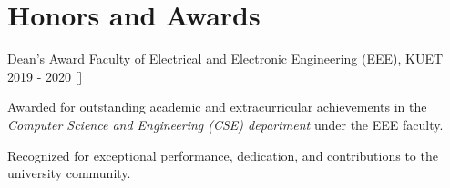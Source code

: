 \section{\textbf{Honors and Awards}}

\resumeSubHeadingListStart

\resumeProject
  {Dean's Award}
  {Faculty of Electrical and Electronic Engineering (EEE), KUET}
  {2019 - 2020}
  {{}[\href{https://old.kuet.ac.bd/index.php/welcome/deanslist}{\textcolor{darkblue}{\faGlobe}}]} %

\resumeItemListStart
  \item Awarded for outstanding academic and extracurricular achievements in the \textit{Computer Science and Engineering (CSE) department} under the EEE faculty.
  \item Recognized for exceptional performance, dedication, and contributions to the university community.
\resumeItemListEnd

\resumeSubHeadingListEnd 

\vspace{-6mm}
